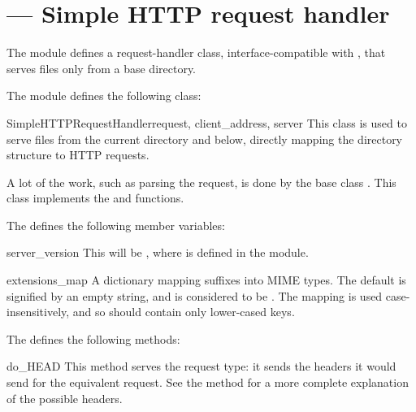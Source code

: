 \section{ ---
         Simple HTTP request handler}



The  module defines a request-handler class,
interface-compatible with ,
that serves files only from a base directory.

The  module defines the following class:

\begin{classdesc}{SimpleHTTPRequestHandler}{request, client_address, server}
This class is used to serve files from the current directory and below,
directly mapping the directory structure to HTTP requests.

A lot of the work, such as parsing the request, is done by the base
class .  This class
implements the  and  functions.
\end{classdesc}

The  defines the following member
variables:

\begin{memberdesc}{server_version}
This will be , where 
is defined in the module.
\end{memberdesc}

\begin{memberdesc}{extensions_map}
A dictionary mapping suffixes into MIME types. The default is signified
by an empty string, and is considered to be .
The mapping is used case-insensitively, and so should contain only
lower-cased keys.
\end{memberdesc}

The  defines the following methods:

\begin{methoddesc}{do_HEAD}{}
This method serves the  request type: it sends the
headers it would send for the equivalent  request. See the
 method for a more complete explanation of the possible
headers.
\end{methoddesc}

